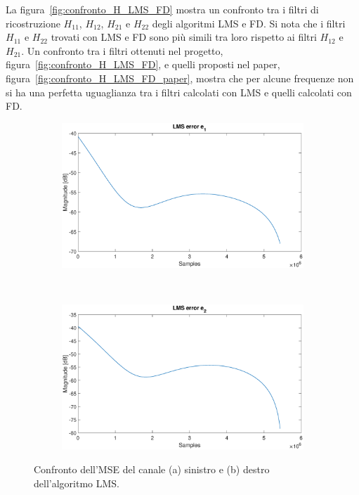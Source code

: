 \documentclass[12pt,a4paper,titlepage]{article}
\begin{document}
La figura~\ref{fig:confronto_H_LMS_FD} mostra un confronto tra i filtri di ricostruzione $H_{11}$, $H_{12}$, $H_{21}$ e $H_{22}$ degli algoritmi LMS e FD. Si nota che i filtri $H_{11}$ e $H_{22}$ trovati con LMS e FD sono più simili tra loro rispetto ai filtri $H_{12}$ e $H_{21}$. Un confronto tra i filtri ottenuti nel progetto, figura~\ref{fig:confronto_H_LMS_FD}, e quelli proposti nel paper, figura~\ref{fig:confronto_H_LMS_FD_paper}, mostra che per alcune frequenze non si ha una perfetta uguaglianza tra i filtri calcolati con LMS e quelli calcolati con FD.

\begin{figure}[h]
	\begin{subfigure}{1\textwidth}
		\includegraphics[width=1\textwidth]{Immagini/mse_e1}
		\caption{}
		\label{mse_e1}
	\end{subfigure}\\
	\begin{subfigure}{1\textwidth}
		\includegraphics[width=1\textwidth]{Immagini/mse_e2}
		\caption{}
		\label{mse_e2}
	\end{subfigure}
	\caption{Confronto dell'MSE del canale (a) sinistro e (b) destro dell'algoritmo LMS.}
	\label{fig:mse_LMS}
\end{figure}
\end{document}
